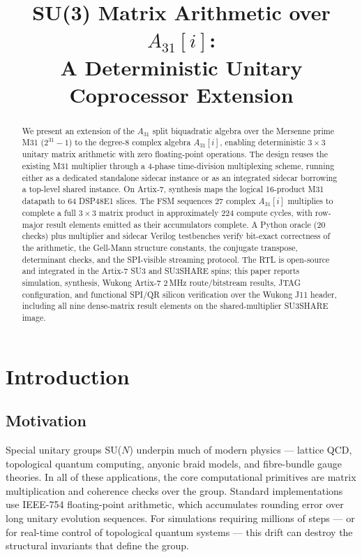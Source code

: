 \documentclass[conference]{IEEEtran}
\title{SU(3) Matrix Arithmetic over $A_{31}[i]$: \\
       A Deterministic Unitary Coprocessor Extension}
\author{
\IEEEauthorblockN{John Curley}
\IEEEauthorblockA{Independent Researcher, SPU-13 Project\\
github.com/pinnacletechnologysolutionsltd/SPU\\
\href{mailto:johncurley@pinnacletechglobal.com}{johncurley@pinnacletechglobal.com}}
}
\begin{document}
\maketitle

\begin{abstract}
We present an extension of the $A_{31}$ split biquadratic algebra over the
Mersenne prime M31 ($2^{31}-1$) to the degree-8 complex algebra $A_{31}[i]$,
enabling deterministic $3\times3$ unitary matrix arithmetic with zero
floating-point operations. The design reuses the existing M31 multiplier
through a 4-phase time-division multiplexing scheme, running either as a
dedicated standalone sidecar instance or as an integrated sidecar borrowing
a top-level shared instance. On Artix-7, synthesis maps the logical
16-product M31 datapath to 64 DSP48E1 slices. The FSM sequences 27 complex
$A_{31}[i]$ multiplies to complete a full $3\times3$ matrix product in
approximately 224 compute cycles, with row-major result elements emitted as
their accumulators complete. A Python oracle (20 checks) plus multiplier and
sidecar Verilog testbenches verify bit-exact correctness of the arithmetic,
the Gell-Mann structure constants, the conjugate transpose, determinant
checks, and the SPI-visible streaming protocol. The RTL is open-source and
integrated in the Artix-7 SU3 and SU3SHARE spins; this paper reports
simulation, synthesis, Wukong Artix-7 2\,MHz route/bitstream results, JTAG
configuration, and functional SPI/QR silicon verification over the Wukong
J11 header, including all nine dense-matrix result elements on the
shared-multiplier SU3SHARE image.
\end{abstract}

\section{Introduction}

\subsection{Motivation}

Special unitary groups SU($N$) underpin much of modern physics --- lattice
QCD, topological quantum computing, anyonic braid models, and fibre-bundle
gauge theories. In all of these applications, the core computational
primitives are matrix multiplication and coherence checks over the group.
Standard implementations use IEEE-754 floating-point arithmetic, which
accumulates rounding error over long unitary evolution sequences. For
simulations requiring millions of steps --- or for real-time control of
topological quantum systems --- this drift can destroy the structural
invariants that define the group.
\end{document}
